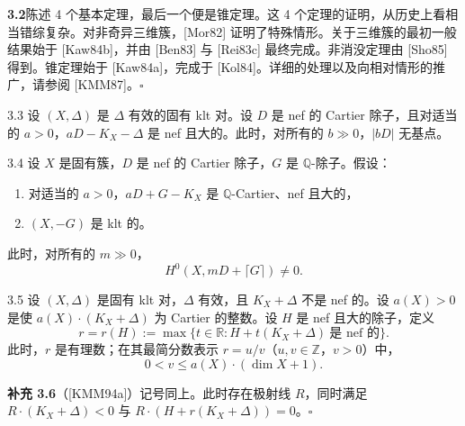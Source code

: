 \par\medskip\noindent\textbf{3.2}\quad 陈述 4 个基本定理，最后一个便是锥定理。这 4 个定理的证明，从历史上看相当错综复杂。对非奇异三维簇，[Mor82] 证明了特殊情形。关于三维簇的最初一般结果始于 [Kaw84b]，并由 [Ben83] 与 [Rei83c] 最终完成。非消没定理由 [Sho85] 得到。锥定理始于 [Kaw84a]，完成于 [Kol84]。详细的处理以及向相对情形的推广，请参阅 [KMM87]。\hfill$\square$\par\medskip

\begin{theorem*}[{无基点定理}]{3.3}
设 $(X,\Delta)$ 是 $\Delta$ 有效的固有 klt 对。设 $D$ 是 nef 的 Cartier 除子，且对适当的 $a>0$，$aD-K_X-\Delta$ 是 nef 且大的。此时，对所有的 $b\gg 0$，$|bD|$ 无基点。
\end{theorem*}

\begin{theorem*}[{非消没定理}]{3.4}
设 $X$ 是固有簇，$D$ 是 nef 的 Cartier 除子，$G$ 是 $\mathbb{Q}$-除子。假设：
\begin{enumerate}[label=(\arabic*),leftmargin=2.4em,itemsep=1pt,topsep=2pt,parsep=0pt]
\item 对适当的 $a>0$，$aD+G-K_X$ 是 $\mathbb{Q}$-Cartier、nef 且大的，
\item $(X,-G)$ 是 klt 的。
\end{enumerate}
此时，对所有的 $m\gg 0$，
\[
H^0(X,mD+\lceil G\rceil)\neq 0.
\]
\end{theorem*}

\begin{theorem*}[{有理性定理}]{3.5}
设 $(X,\Delta)$ 是固有 klt 对，$\Delta$ 有效，且 $K_X+\Delta$ 不是 nef 的。设 $a(X)>0$ 是使 $a(X)\cdot(K_X+\Delta)$ 为 Cartier 的整数。设 $H$ 是 nef 且大的除子，定义
\[
r=r(H):=\max\{t\in\mathbb{R}:H+t(K_X+\Delta)\ \text{是 nef 的}\}.
\]
此时，$r$ 是有理数；在其最简分数表示 $r=u/v$（$u,v\in\mathbb{Z}$，$v>0$）中，
\[
0<v\leq a(X)\cdot(\dim X+1).
\]
\end{theorem*}

\par\medskip\noindent\textbf{补充 3.6}（[KMM94a]）\quad 记号同上。此时存在极射线 $R$，同时满足 $R\cdot(K_X+\Delta)<0$ 与 $R\cdot(H+r(K_X+\Delta))=0$。\hfill$\square$\par\medskip

